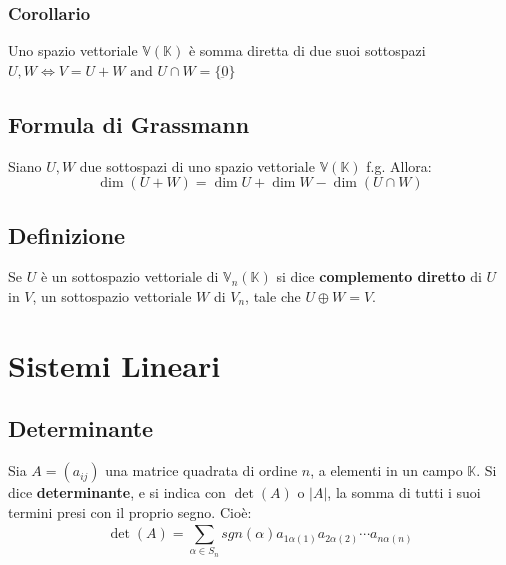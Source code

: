 \documentclass{article}
\newcommand{\V}{\mathbb{V} (\mathbb{K})}
\newcommand{\Vx}[1]{\mathbb{V}_#1 (\mathbb{K})}
\newcommand{\ah}{\alpha}
\begin{document}
\subsubsection{Corollario}
Uno spazio vettoriale $\V$ è somma diretta di due suoi sottospazi $U, W \iff{V}
    = U+W \text{ and } U \cap{W} = \{\underbar{0}\}$

\subsection{Formula di Grassmann}
Siano $U, W$ due sottospazi di uno spazio vettoriale $\V$ f.g. Allora:
\[
    \dim(U+W) = \dim U + \dim W - \dim(U\cap W)
\]

\subsection{Definizione}
Se $U$ è un sottospazio vettoriale di $\Vx{n}$ si dice \textbf{complemento
    diretto} di $U$ in $V$, un sottospazio vettoriale $W$ di $V_n$, tale che
$U\oplus{W} = V$.

\section{Sistemi Lineari}
\subsection{Determinante}
Sia $A = (a_{ij})$ una matrice quadrata di ordine $n$, a elementi in un campo
$\mathbb{K}$. Si dice \textbf{determinante}, e si indica con $\det(A)$ o $|A|$,
la somma di tutti i suoi termini presi con il proprio segno. Cioè:
\[
    \det(A) = \sum_{\ah\in S_n}^{}sgn(\ah)a_{1\ah(1)}a_{2\ah(2)}\cdots a_{n\ah(n)}
\]
\end{document}
